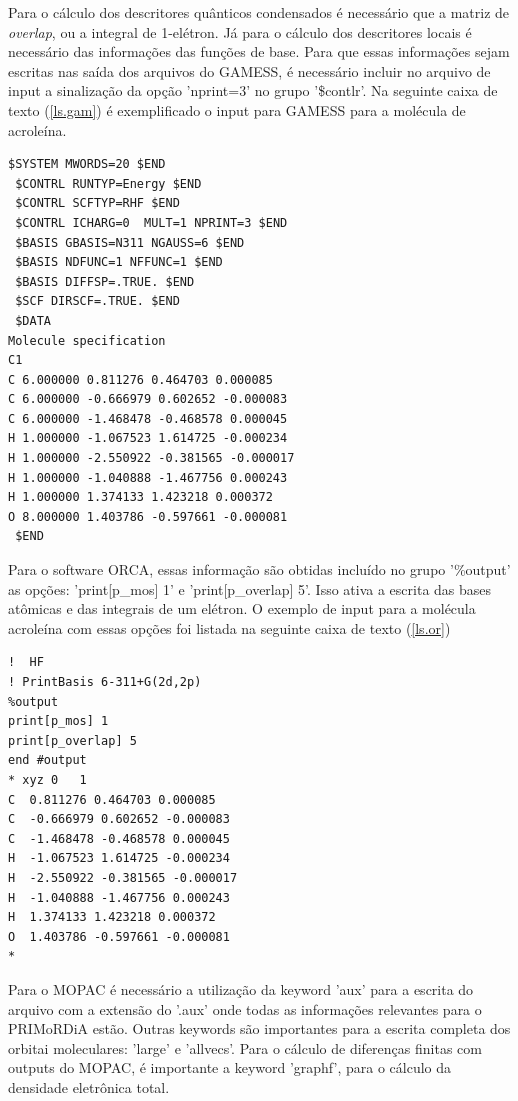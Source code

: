 \documentclass[a4paper,11pt]{refart}
\begin{document}
Para o cálculo dos descritores quânticos condensados é necessário que a matriz de \textit{overlap}, ou a integral de 1-elétron. Já para o cálculo dos descritores locais é necessário das informações das funções de base. Para que essas informações sejam escritas nas saída dos arquivos do GAMESS, é necessário incluir no arquivo de input a sinalização da opção 'nprint=3' no grupo '\$contlr'. Na seguinte caixa de texto (\autoref{ls.gam}) é exemplificado o input para GAMESS para a molécula de acroleína. 


\begin{minipage}{\textwidth}
\begin{lstlisting}[caption={Exemplo de input do Gamess},label={ls.gam}]
 $SYSTEM MWORDS=20 $END
 $CONTRL RUNTYP=Energy $END
 $CONTRL SCFTYP=RHF $END
 $CONTRL ICHARG=0  MULT=1 NPRINT=3 $END
 $BASIS GBASIS=N311 NGAUSS=6 $END
 $BASIS NDFUNC=1 NFFUNC=1 $END
 $BASIS DIFFSP=.TRUE. $END
 $SCF DIRSCF=.TRUE. $END
 $DATA
Molecule specification
C1
C 6.000000 0.811276 0.464703 0.000085
C 6.000000 -0.666979 0.602652 -0.000083
C 6.000000 -1.468478 -0.468578 0.000045
H 1.000000 -1.067523 1.614725 -0.000234
H 1.000000 -2.550922 -0.381565 -0.000017
H 1.000000 -1.040888 -1.467756 0.000243
H 1.000000 1.374133 1.423218 0.000372
O 8.000000 1.403786 -0.597661 -0.000081
 $END
\end{lstlisting}
\end{minipage}

Para o software ORCA, essas informação são obtidas incluído no grupo '\%output' as opções: 'print[p\_mos] 1' e 'print[p\_overlap] 5'. Isso ativa a escrita das bases atômicas e das integrais de um elétron. O exemplo de input para a molécula acroleína com essas opções foi listada na seguinte caixa de texto (\autoref{ls.or})

\begin{minipage}{\textwidth}
\begin{lstlisting}[caption={Exemplo de input para o ORCA},label={ls.or}]
!  HF 
! PrintBasis 6-311+G(2d,2p)
%output
print[p_mos] 1
print[p_overlap] 5 
end #output
* xyz 0   1
C  0.811276 0.464703 0.000085
C  -0.666979 0.602652 -0.000083
C  -1.468478 -0.468578 0.000045
H  -1.067523 1.614725 -0.000234
H  -2.550922 -0.381565 -0.000017
H  -1.040888 -1.467756 0.000243
H  1.374133 1.423218 0.000372
O  1.403786 -0.597661 -0.000081
*
\end{lstlisting}
\end{minipage}

Para o MOPAC é necessário a utilização da keyword 'aux' para a escrita do arquivo com a extensão do '.aux' onde todas as informações relevantes para o PRIMoRDiA estão. Outras keywords são importantes para a escrita completa dos orbitai moleculares: 'large' e 'allvecs'. Para o cálculo de diferenças finitas com outputs do MOPAC, é importante a keyword 'graphf', para o cálculo da densidade eletrônica total. 
\end{document}
